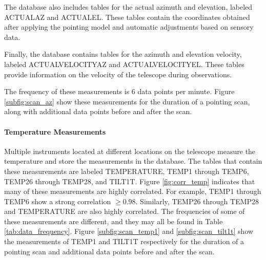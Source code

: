The database also includes tables for the actual azimuth and elevation, labeled ACTUALAZ and ACTUALEL.
These tables contain the coordinates obtained after applying the pointing model and automatic adjustments based on sensory data.

Finally, the database contains tables for the azimuth and elevation velocity, labeled ACTUALVELOCITYAZ and ACTUALVELOCITYEL.
These tables provide information on the velocity of the telescope during observations.

The frequency of these measurements is $6$ data points per minute.
Figure \ref{subfig:scan_az} show these measurements for the duration of a pointing scan, along with additional data points before and after the scan.


\paragraph{Temperature Measurements}
Multiple instruments located at different locations on the telescope measure the temperature and store the measurements in the database.
The tables that contain these measurements are labeled TEMPERATURE, TEMP1 through TEMP6, TEMP26 through TEMP28, and TILT1T. 
Figure \ref{fig:corr_temp} indicates that many of these measurements are highly correlated.
For example, TEMP1 through TEMP6 show a strong correlation $\geq 0.98$.
Similarly, TEMP26 through TEMP28 and TEMPERATURE are also highly correlated.
The frequencies of some of these measurements are different, and they may all be found in Table \ref{tab:data_frequency}.
Figure \ref{subfig:scan_temp1} and \ref{subfig:scan_tilt1t} show the measurements of TEMP1 and TILT1T respectively
for the duration of a pointing scan and additional data points before and after the scan.


